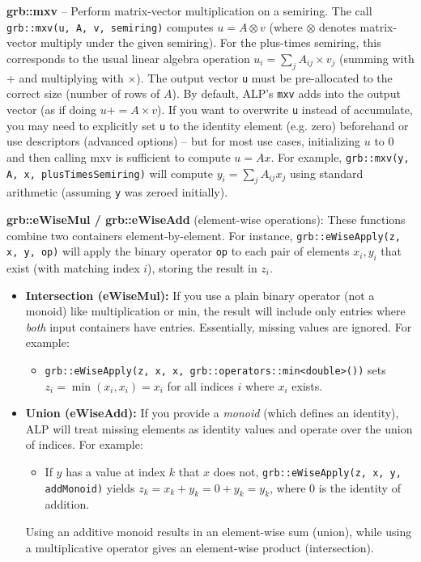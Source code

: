     \textbf{grb::mxv} – Perform matrix-vector multiplication on a semiring. The call \texttt{grb::mxv(u, A, v, semiring)} computes $u = A \otimes v$ (where $\otimes$ denotes matrix-vector multiply under the given semiring). For the plus-times semiring, this corresponds to the usual linear algebra operation $u_i = \sum_j A_{ij} \times v_j$ (summing with + and multiplying with $\times$). The output vector \texttt{u} must be pre-allocated to the correct size (number of rows of $A$). By default, ALP’s \texttt{mxv} adds into the output vector (as if doing $u += A \times v$). If you want to overwrite \texttt{u} instead of accumulate, you may need to explicitly set \texttt{u} to the identity element (e.g. zero) beforehand or use descriptors (advanced options) – but for most use cases, initializing $u$ to 0 and then calling mxv is sufficient to compute $u = A x$. For example, \texttt{grb::mxv(y, A, x, plusTimesSemiring)} will compute $y_i = \sum_j A_{ij} x_j$ using standard arithmetic (assuming \texttt{y} was zeroed initially).
\newline


        \textbf{grb::eWiseMul / grb::eWiseAdd} (element-wise operations): These functions combine two containers element-by-element. For instance, \texttt{grb::eWiseApply(z, x, y, op)} will apply the binary operator \texttt{op} to each pair of elements $x_i, y_i$ that exist (with matching index $i$), storing the result in $z_i$.

\begin{itemize}
  \item \textbf{Intersection (eWiseMul):} If you use a plain binary operator (not a monoid) like multiplication or min, the result will include only entries where \emph{both} input containers have entries. Essentially, missing values are ignored. For example:
  \begin{itemize}
    \item \texttt{grb::eWiseApply(z, x, x, grb::operators::min<double>())} sets $z_i = \min(x_i, x_i) = x_i$ for all indices $i$ where $x_i$ exists.
  \end{itemize}

  \item \textbf{Union (eWiseAdd):} If you provide a \emph{monoid} (which defines an identity), ALP will treat missing elements as identity values and operate over the union of indices. For example:
  \begin{itemize}
    \item If $y$ has a value at index $k$ that $x$ does not, \texttt{grb::eWiseApply(z, x, y, addMonoid)} yields $z_k = x_k + y_k = 0 + y_k = y_k$, where 0 is the identity of addition.
  \end{itemize}
  Using an additive monoid results in an element-wise sum (union), while using a multiplicative operator gives an element-wise product (intersection).
\end{itemize}

